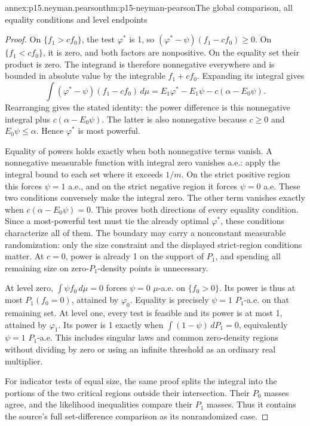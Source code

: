 \begin{annexitem}{annex:p15.neyman.pearson}{thm:p15-neyman-pearson}{The global comparison, all equality conditions and level endpoints}
\begin{proof}
On \(\{f_1>cf_0\}\), the test \(\varphi^*\) is 1,
so \((\varphi^*-\psi)(f_1-cf_0)\geq0\).
On \(\{f_1<cf_0\}\), it is zero, and both factors
are nonpositive. On the equality set their
product is zero. The integrand is therefore
nonnegative everywhere and is bounded in
absolute value by the integrable \(f_1+cf_0\).
Expanding its integral gives
\[
 \int(\varphi^*-\psi)(f_1-cf_0)\,d\mu
             =E_1\varphi^*-E_1\psi-c(\alpha-E_0\psi).
\]
Rearranging gives the stated identity:
the power difference is this nonnegative
integral plus \(c(\alpha-E_0\psi)\).
The latter is also nonnegative because \(c\geq0\) and
\(E_0\psi\leq\alpha\). Hence \(\varphi^*\)
is most powerful.

Equality of powers holds exactly when both
nonnegative terms vanish. A nonnegative
measurable function with integral zero
vanishes a.e.: apply the integral bound
to each set where it exceeds \(1/m\).
On the strict positive region this forces
\(\psi=1\) a.e., and on the strict
negative region it forces \(\psi=0\) a.e.
These two conditions conversely make the
integral zero. The other term vanishes
exactly when \(c(\alpha-E_0\psi)=0\).
This proves both directions of every
equality condition.
Since a most-powerful test must tie the
already optimal \(\varphi^*\), these
conditions characterize all of them.
The boundary may carry a nonconstant
measurable randomization: only the size
constraint and the displayed strict-region
conditions matter. At \(c=0\), power is
already 1 on the support of \(P_1\),
and spending all remaining size on
zero-\(P_1\)-density points is unnecessary.

At level zero, \(\int\psi f_0\,d\mu=0\)
forces \(\psi=0\) \(\mu\)-a.e. on
\(\{f_0>0\}\). Its power is thus at
most \(P_1(f_0=0)\), attained by
\(\varphi_0\). Equality is precisely
\(\psi=1\) \(P_1\)-a.e. on that
remaining set. At level one, every
test is feasible and its power is
at most 1, attained by \(\varphi_1\).
Its power is 1 exactly when
\(\int(1-\psi)\,dP_1=0\), equivalently
\(\psi=1\) \(P_1\)-a.e.
This includes singular laws and common
zero-density regions without dividing
by zero or using an infinite threshold
as an ordinary real multiplier.

For indicator tests of equal size, the
same proof splits the integral into
the portions of the two critical
regions outside their intersection.
Their \(P_0\) masses agree, and the
likelihood inequalities compare their
\(P_1\) masses. Thus it contains
the source's full set-difference
comparison as its nonrandomized case.
\end{proof}
\end{annexitem}

